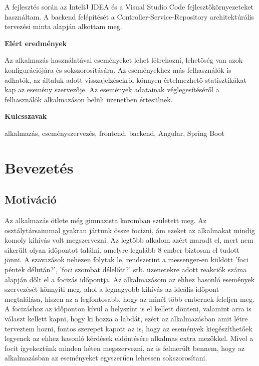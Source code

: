 \documentclass[a4paper,12pt]{report}
\theoremstyle{definition}
\theoremstyle{remark}
\begin{document}
A fejlesztés során az InteliJ IDEA és a Visual Studio Code fejlesztőkörnyezeteket használtam. A backend felépítését a Controller-Service-Repository architektúrális tervezési minta alapján alkottam meg.	

\bigskip

{\bf Elért eredmények}

\medskip

Az alkalmazás használatával eseményeket lehet létrehozni, lehetőség van azok konfigurációjára és sokszorosítására. Az eseményekhez más felhasználók is adhatók, az általuk adott visszajelzésekről könnyen értelmezhető statisztikákat kap az esemény szervezője. Az események adatainak véglegesítéséről a felhasználók alkalmazáson belüli üzenetben értesülnek.

\bigskip

{\bf Kulcsszavak}

\medskip

alkalmazás, eseményszervezés, frontend, backend, Angular, Spring Boot


\newpage

\pagebreak

\tableofcontents
\pagebreak


\chapter{Bevezetés}

\pagestyle{titled}

\section{Motiváció}

Az alkalmazás ötlete még gimnazista koromban született meg. Az osztálytársaimmal gyakran jártunk össze focizni, ám ezeket az alkalmakat mindig komoly kihívás volt megszervezni. Az legtöbb alkalom azért maradt el, mert nem sikerült olyan időpontot találni, amelyre legalább 8 ember biztosan el tudott jönni. A szavazások nehezen folytak le, rendszerint a messenger-en küldött 'foci péntek délután?', 'foci szombat délelőtt?' stb. üzenetekre adott reakciók száma alapján dőlt el a focizás időpontja. Az alkalmazásom az ehhez hasonló események szervezését könnyíti meg, ahol a legnagyobb kihívás az ideális időpont megtalálása, hiszen az a legfontosabb, hogy az minél több embernek feleljen meg. A focizáshoz az időponton kívül a helyszínt is el kellett dönteni, valamint arra is választ kellett kapni, hogy ki hozza a labdát, ezért az alkalmazásban amit létre terveztem hozni, fontos szerepet kapott az is, hogy az események kiegészíthetőek legyenek az ehhez hasonló kérdések eldöntésére alkalmas extra mezőkkel. Mivel a focit igyekeztünk minden héten megszervezni, az is felmerült bennem, hogy az alkalmazásban az eseményeket egyszerűen lehessen sokszorosítani.
\end{document}
